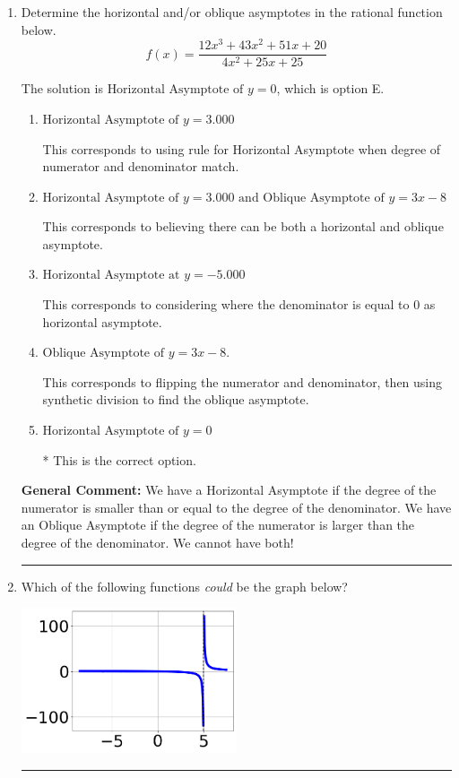 \documentclass{extbook}[14pt]
\newcommand{\litem}[1]{\item #1

\rule{\textwidth}{0.4pt}}
\begin{document}
\begin{enumerate}\litem{
Determine the horizontal and/or oblique asymptotes in the rational function below.
\[ f(x) = \frac{12x^{3} +43 x^{2} +51 x + 20}{4x^{2} +25 x + 25} \]

The solution is \( \text{Horizontal Asymptote of } y = 0 \), which is option E.\begin{enumerate}[label=\Alph*.]
\item \( \text{Horizontal Asymptote of } y = 3.000  \)

This corresponds to using rule for Horizontal Asymptote when degree of numerator and denominator match.
\item \( \text{Horizontal Asymptote of } y = 3.000 \text{ and Oblique Asymptote of } y = 3x -8 \)

This corresponds to believing there can be both a horizontal and oblique asymptote.
\item \( \text{Horizontal Asymptote at } y = -5.000 \)

This corresponds to considering where the denominator is equal to 0 as horizontal asymptote.
\item \( \text{Oblique Asymptote of } y = 3x -8. \)

This corresponds to flipping the numerator and denominator, then using synthetic division to find the oblique asymptote.
\item \( \text{Horizontal Asymptote of } y = 0 \)

* This is the correct option.
\end{enumerate}

\textbf{General Comment:} We have a Horizontal Asymptote if the degree of the numerator is smaller than or equal to the degree of the denominator. We have an Oblique Asymptote if the degree of the numerator is larger than the degree of the denominator. We cannot have both!
}
\litem{
Which of the following functions \textit{could} be the graph below?

\begin{center}
    \includegraphics[width=0.5\textwidth]{../Figures/identifyGraphOfRationalFunctionCopyC.png}
\end{center}




}
\end{enumerate}
\end{document}
